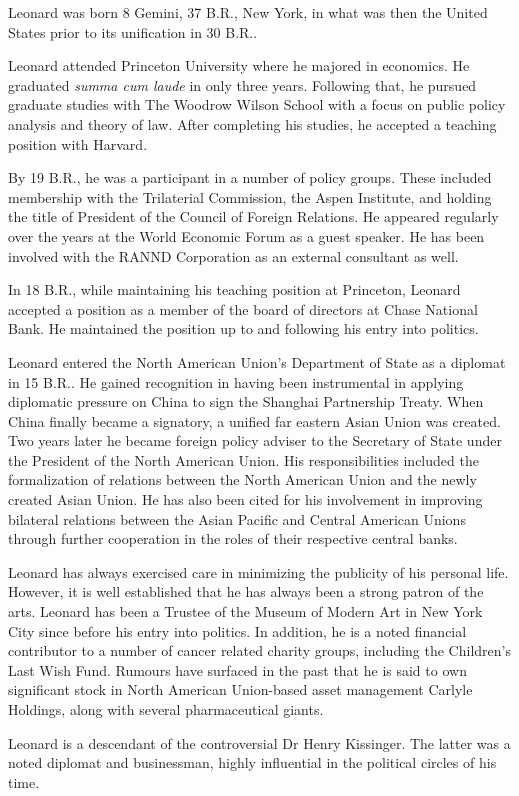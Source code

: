 
Leonard was born 8 Gemini, 37 B.R., New York, in what was then the United States prior to its unification in 30 B.R..

Leonard attended Princeton University where he majored in economics. He graduated {\it summa cum laude} in only three years. Following that, he pursued graduate studies with The Woodrow Wilson School with a focus on public policy analysis and theory of law. After completing his studies, he accepted a teaching position with Harvard.

By 19 B.R., he was a participant in a number of policy groups. These included membership with the Trilaterial Commission, the Aspen Institute, and holding the title of President of the Council of Foreign Relations. He appeared regularly over the years at the World Economic Forum as a guest speaker. He has been involved with the RANND Corporation as an external consultant as well.

In 18 B.R., while maintaining his teaching position at Princeton, Leonard accepted a position as a member of the board of directors at Chase National Bank. He maintained the position up to and following his entry into politics.

Leonard entered the North American Union's Department of State as a diplomat in 15 B.R.. He gained recognition in having been instrumental in applying diplomatic pressure on China to sign the Shanghai Partnership Treaty. When China finally became a signatory, a unified far eastern Asian Union was created. Two years later he became foreign policy adviser to the Secretary of State under the President of the North American Union. His responsibilities included the formalization of relations between the North American Union and the newly created Asian Union. He has also been cited for his involvement in improving bilateral relations between the Asian Pacific and Central American Unions through further cooperation in the roles of their respective central banks.

Leonard has always exercised care in minimizing the publicity of his personal life. However, it is well established that he has always been a strong patron of the arts. Leonard has been a Trustee of the Museum of Modern Art in New York City since before his entry into politics. In addition, he is a noted financial contributor to a number of cancer related charity groups, including the Children's Last Wish Fund. Rumours have surfaced in the past that he is said to own significant stock in North American Union-based asset management Carlyle Holdings, along with several pharmaceutical giants.

Leonard is a descendant of the controversial Dr Henry Kissinger. The latter was a noted diplomat and businessman, highly influential in the political circles of his time.

